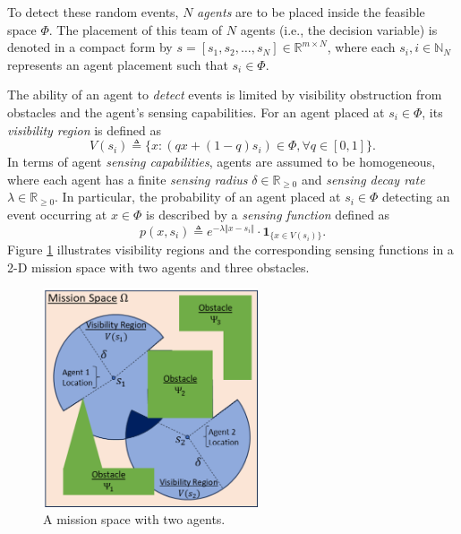 \documentclass[letterpaper, 10 pt, conference]{ieeeconf}
\newcommand{\R}{\mathbb{R}}
\newcommand{\N}{\mathbb{N}}
\begin{document}
To detect these random events, $N$ \emph{agents} are to be placed inside the feasible space $\Phi$. The placement of this team of $N$ agents (i.e., the decision variable) is denoted in a compact form by $s = [s_1, s_2, \ldots, s_N]\in\R^{m\times N}$, where each $s_i, i\in\N_N$ represents an agent placement such that $s_i\in \Phi$. 

The ability of an agent to \emph{detect} events is limited by visibility obstruction from obstacles and the agent's sensing capabilities. For an agent placed at $s_i \in \Phi$, its \emph{visibility region} is defined as 
$$
V(s_i) \triangleq \{x: (qx+(1-q)s_i)\in \Phi, \forall q \in [0,1] \}.
$$ 
In terms of agent \emph{sensing capabilities}, agents are assumed to be homogeneous, where each agent has a finite \emph{sensing radius} $\delta \in \R_{\geq 0}$ and \emph{sensing decay rate} $\lambda\in\R_{\geq 0}$. In particular, the probability of an agent placed at $s_i\in \Phi$ detecting an event occurring at $x\in \Phi$ is described by a \emph{sensing function} defined as 
\begin{equation}
\label{Eq:SensingFunction}
p(x,s_i)\triangleq e^{-\lambda \Vert x - s_i\Vert}\cdot\mathbf{1}_{\{x\in V(s_i)\}}.
\end{equation}
Figure \ref{Fig:Geometry} illustrates visibility regions and the corresponding sensing functions in a 2-D mission space with two agents and three obstacles.

\begin{figure}[!b]
    \centering
    \includegraphics[width=2.5in]{Figures/Geometry.png}
    \caption{A mission space with two agents.}
    \label{Fig:Geometry}
\end{figure}
\end{document}
